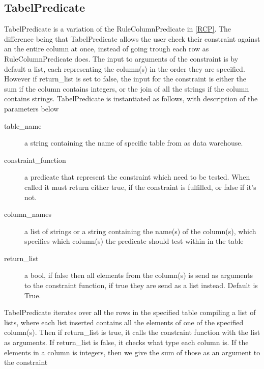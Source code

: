 \subsection{TabelPredicate}
TabelPredicate is a variation of the RuleColumnPredicate in \cref{RCP}. The difference being that TabelPredicate allows the user check their constraint against an the entire column at once, instead of going trough each row as RuleColumnPredicate does. The input to arguments of the constraint is by default a list, each representing the column(s) in the order they are specified. However if return\_list is set to false, the input for the constraint is either the sum if the column contains integers, or the join of all the strings if the column contains strings. TabelPredicate is instantiated as follows, with description of the parameters below


\begin{description}
\item [table\_name] a string containing the name of specific table from as data warehouse. 
\item [constraint\_function] a predicate that represent the constraint which need to be tested. When called it must return either true, if the constraint is fulfilled, or false if it's not.
\item [column\_names] a list of strings or a string containing the name(s) of the column(s), which specifies which column(s) the predicate should test within in the table
\item [return\_list] a bool, if false then all elements from the column(s) is send as arguments to the constraint function, if true they are send as a list instead. Default is True.
\end{description}

TabelPredicate iterates over all the rows in the specified table compiling a list of lists, where each list inserted contains all the elements of one of the specified column(s). Then if return\_list is true, it calls the constraint function with the list as arguments. If return\_list is false, it checks what type each column is. If the elements in a column is integers, then we give the sum of those as an argument to the constraint
